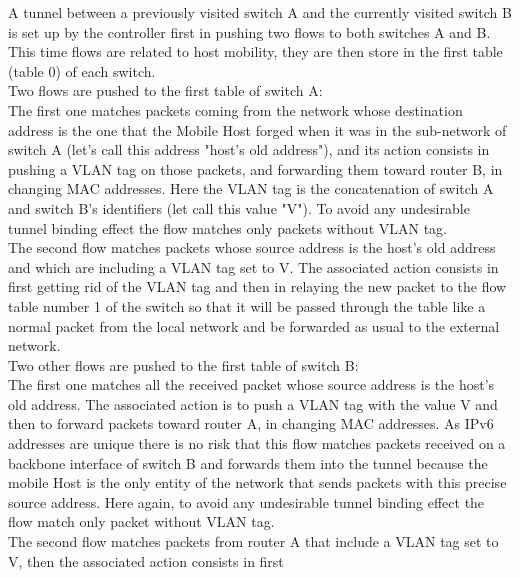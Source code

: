 \documentclass{article}
\begin{document}
A tunnel between a previously visited switch A and the currently
visited switch B is set up by the controller first in pushing two
flows to both switches A and B. This time flows are related to host
mobility, they are then store in the first table (table 0) of each
switch.\\
\newline
Two flows are pushed to the first table of switch A:\\
\newline
The first one matches packets coming from the network whose
destination address is the one that the Mobile Host forged when it
was in the sub-network of switch A (let's call this address
"host's old address"), and its action consists in pushing a VLAN
tag on those packets, and forwarding them toward router B, in
changing MAC addresses. Here the VLAN tag is the concatenation of
switch A and switch B's identifiers (let call this value "V"). To
avoid any undesirable tunnel binding effect the flow matches only
packets without VLAN tag.\\
\newline
The second flow matches packets whose source address is the host's
old address and which are including a VLAN tag set to V. The
associated action consists in first getting rid of the VLAN tag
and then in relaying the new packet to the flow table number 1 of
the switch so that it will be passed through the table like a
normal packet from the local network and be forwarded as usual to
the external network.\\
\newline
Two other flows are pushed to the first table of switch B:\\
\newline
The first one matches all the received packet whose source address
is the host's old address. The associated action is to push a VLAN
tag with the value V and then to forward packets toward router A,
in changing MAC addresses. As IPv6 addresses are unique there is
no risk that this flow matches packets received on a backbone
interface of switch B and forwards them into the tunnel because
the mobile Host is the only entity of the network that sends
packets with this precise source address. Here again, to avoid any
undesirable tunnel binding effect the flow match only packet
without VLAN tag.\\
\newline
The second flow matches packets from router A that include a VLAN
tag set to V, then the associated action consists in first
\end{document}
